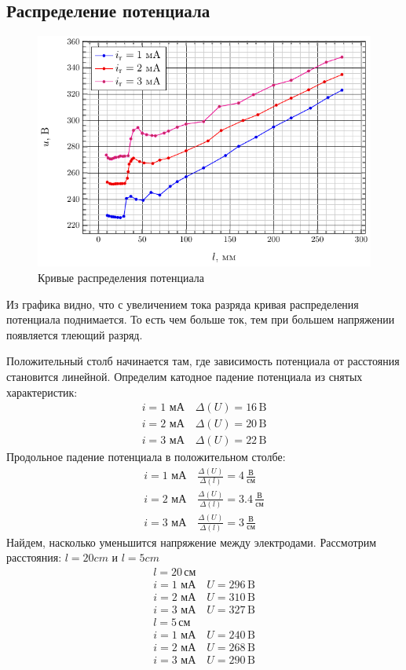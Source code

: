 \documentclass[a5paper,11pt]{extarticle}
\begin{document}
\subsection{Распределение потенциала}
\begin{figure}[H]
	\centering
	\includegraphics[]{fig/u_from_l.pdf}
	\caption{Кривые распределения потенциала}
	\label{fig:1}
\end{figure}
Из графика видно, что с увеличением тока разряда кривая распределения потенциала поднимается. То есть чем больше ток, тем при большем напряжении появляется тлеющий разряд.

Положительный столб начинается там, где зависимость потенциала от расстояния становится линейной. 
Определим катодное падение потенциала из снятых характеристик:
\begin{gather}
	i=1\text{ мА} \quad \Delta(U) = 16 \,\text{B}\\
	i=2\text{ мА} \quad \Delta(U) = 20\, \text{B}\\
	i=3\text{ мА} \quad \Delta(U) = 22 \,\text{B}
\end{gather}
Продольное падение потенциала в положительном столбе:
\begin{gather}
	i=1\text{ мА} \quad \frac{\Delta(U)}{\Delta(l)} = 4 \,\frac{\text{В}}{\text{см}}\\
	i=2\text{ мА} \quad \frac{\Delta(U)}{\Delta(l)} = 3.4\,\frac{\text{В}}{\text{см}}\\
	i=3\text{ мА} \quad \frac{\Delta(U)}{\Delta(l)} = 3 \,\frac{\text{В}}{\text{см}}
\end{gather}
Найдем, насколько уменьшится напряжение между электродами. Рассмотрим расстояния: $l=20 cm$ и $l = 5 cm$
\begin{gather}
	l=20 \,\text{см}\\
	i=1\text{ мА} \quad U = 296  \,\text{B}\\
	i=2\text{ мА} \quad U = 310  \,\text{B}\\
	i=3\text{ мА} \quad U = 327  \,\text{B}
\end{gather}
\begin{gather}
	l=5 \,\text{см}\\
	i=1\text{ мА} \quad U = 240  \,\text{B}\\
	i=2\text{ мА} \quad U = 268  \,\text{B}\\
	i=3\text{ мА} \quad U = 290  \,\text{B}
\end{gather}
\end{document}
